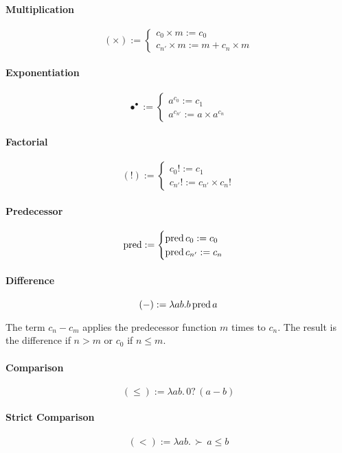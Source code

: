 \paragraph{Multiplication}
$$ (\times) :=
\begin{cases}
  c_0 \times m := c_0 \\
  c_{n'} \times m := m + c_n \times m
\end{cases}
$$

\paragraph{Exponentiation}
$$ \bullet^\bullet :=
\begin{cases}
  a^{c_0}  := c_1 \\
  a^{c_{n'}} := a \times a^{c_n}
\end{cases}
$$

\paragraph{Factorial}
$$ (!) :=
\begin{cases}
  c_0!  := c_1 \\
  c_{n'}! := c_{n'} \times c_n!
\end{cases}
$$

\paragraph{Predecessor}
$$ \text{pred} :=
\begin{cases}
  \text{pred}\, c_0 := c_0 \\
  \text{pred}\, c_{n'} := c_n
\end{cases}
$$


\paragraph{Difference}
$$ (-) := \lambda a b. b\, \text{pred}\, a $$

The term $c_n - c_m$ applies the predecessor function $m$ times to $c_n$. The
result is the difference if $n > m$ or $c_0$ if $n \le m$.

\paragraph{Comparison}
$$ (\le) := \lambda a b.\, 0?\, (a - b) $$

\paragraph{Strict Comparison}
$$ (<) := \lambda a b.\, \succ\, a \le b $$


